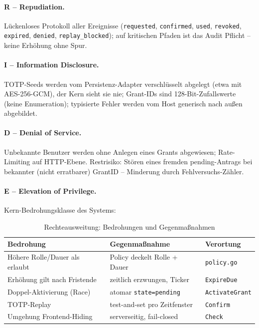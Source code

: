 \documentclass[11pt,a4paper]{article}
\begin{document}
\paragraph{R -- Repudiation.} Lückenloses Protokoll aller Ereignisse
(\texttt{requested}, \texttt{confirmed}, \texttt{used}, \texttt{revoked},
\texttt{expired}, \texttt{denied}, \texttt{replay\_blocked}); auf kritischen
Pfaden ist das Audit Pflicht -- keine Erhöhung ohne Spur.

\paragraph{I -- Information Disclosure.} TOTP-Seeds werden vom Persistenz-Adapter
verschlüsselt abgelegt (etwa mit AES-256-GCM), der Kern sieht sie nie; Grant-IDs
sind 128-Bit-Zufallswerte (keine Enumeration); typisierte Fehler werden vom Host
generisch nach außen abgebildet.

\paragraph{D -- Denial of Service.} Unbekannte Benutzer werden ohne Anlegen
eines Grants abgewiesen; Rate-Limiting auf HTTP-Ebene. Restrisiko: Stören eines
fremden pending-Antrags bei bekannter (nicht erratbarer) GrantID -- Minderung
durch Fehlversuchs-Zähler.

\paragraph{E -- Elevation of Privilege.} Kern-Bedrohungsklasse des Systems:

\begin{table}[htbp]
  \centering
  \caption{Rechteausweitung: Bedrohungen und Gegenmaßnahmen}
  \begin{tabular}{@{}lll@{}}
    \toprule
    \textbf{Bedrohung} & \textbf{Gegenmaßnahme} & \textbf{Verortung} \\
    \midrule
    Höhere Rolle/Dauer als erlaubt & Policy deckelt Rolle + Dauer & \texttt{policy.go} \\
    Erhöhung gilt nach Fristende   & zeitlich erzwungen, Ticker   & \texttt{ExpireDue} \\
    Doppel-Aktivierung (Race)      & atomar \texttt{state=pending}& \texttt{ActivateGrant} \\
    TOTP-Replay                    & test-and-set pro Zeitfenster & \texttt{Confirm} \\
    Umgehung Frontend-Hiding       & serverseitig, fail-closed    & \texttt{Check} \\
    \bottomrule
  \end{tabular}
\end{table}
\end{document}
